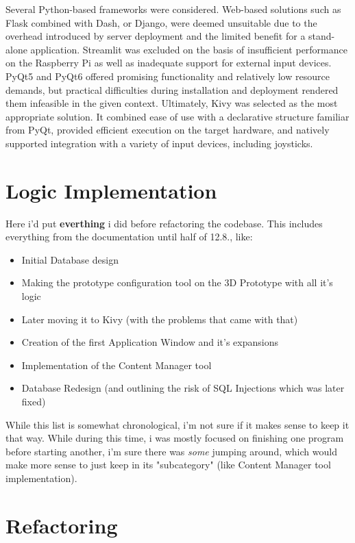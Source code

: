 Several Python-based frameworks were considered. Web-based solutions such as Flask combined with Dash, or Django, were deemed unsuitable due to the overhead introduced by server deployment and the limited benefit for a stand-alone application. Streamlit was excluded on the basis of insufficient performance on the Raspberry Pi as well as inadequate support for external input devices. PyQt5 and PyQt6 offered promising functionality and relatively low resource demands, but practical difficulties during installation and deployment rendered them infeasible in the given context. Ultimately, Kivy was selected as the most appropriate solution. It combined ease of use with a declarative structure familiar from PyQt, provided efficient execution on the target hardware, and natively supported integration with a variety of input devices, including joysticks.



\section{Logic Implementation}
Here i'd put \textbf{everthing} i did before refactoring the codebase. This includes everything from the documentation until half of 12.8., like:
\begin{itemize}
	\item Initial Database design
	\item Making the prototype configuration tool on the 3D Prototype with all it's logic 
	\item Later moving it to Kivy (with the problems that came with that)
	\item Creation of the first Application Window and it's expansions
	\item Implementation of the Content Manager tool
	\item Database Redesign (and outlining the risk of SQL Injections which was later fixed)
\end{itemize}

While this list is somewhat chronological, i'm not sure if it makes sense to keep it that way. While during this time, i was mostly focused on finishing one program before starting another, i'm sure there was \textit{some} jumping around, which would make more sense to just keep in its "subcategory" (like Content Manager tool implementation).

\section{Refactoring}

